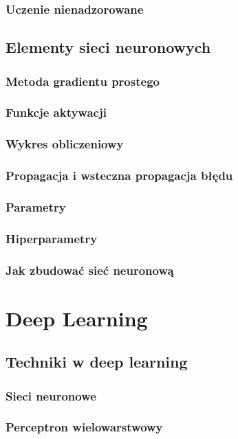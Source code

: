 \documentclass[a4paper,twoside,titlepage,openright]{book}
\begin{document}
\subsection*{Uczenie nienadzorowane}

\section{Elementy sieci neuronowych}
\subsection{Metoda gradientu prostego}
\subsection{Funkcje aktywacji}
\subsection{Wykres obliczeniowy}
\subsection{Propagacja i wsteczna propagacja błędu}
\subsection{Parametry}
\subsection{Hiperparametry}
\subsection{Jak zbudować sieć neuronową}

\chapter{Deep Learning}

\section{Techniki w deep learning}

\subsection{Sieci neuronowe}
\subsection{Perceptron wielowarstwowy}
\end{document}

